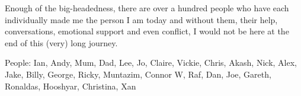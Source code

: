 Enough of the big-headedness, there are over a hundred people who have each individually made me the person I am today and without them, their help, conversations, emotional support and even conflict, I would not be here at the end of this (very) long journey.

People: Ian, Andy, Mum, Dad, Lee, Jo, Claire, Vickie, Chris, Akash, Nick, Alex, Jake, Billy, George, Ricky, Muntazim, Connor W, Raf, Dan, Joe, Gareth, Ronaldas, Hooshyar, Christina, Xan